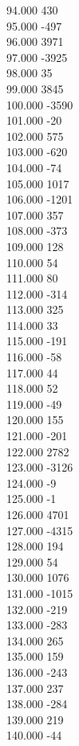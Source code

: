 { 94.000	430 \\
 95.000	-497 \\
 96.000	3971 \\
 97.000	-3925 \\
 98.000	35 \\
 99.000	3845 \\
 100.000	-3590 \\
 101.000	-20 \\
 102.000	575 \\
 103.000	-620 \\
 104.000	-74 \\
 105.000	1017 \\
 106.000	-1201 \\
 107.000	357 \\
 108.000	-373 \\
 109.000	128 \\
 110.000	54 \\
 111.000	80 \\
 112.000	-314 \\
 113.000	325 \\
 114.000	33 \\
 115.000	-191 \\
 116.000	-58 \\
 117.000	44 \\
 118.000	52 \\
 119.000	-49 \\
 120.000	155 \\
 121.000	-201 \\
 122.000	2782 \\
 123.000	-3126 \\
 124.000	-9 \\
 125.000	-1 \\
 126.000	4701 \\
 127.000	-4315 \\
 128.000	194 \\
 129.000	54 \\
 130.000	1076 \\
 131.000	-1015 \\
 132.000	-219 \\
 133.000	-283 \\
 134.000	265 \\
 135.000	159 \\
 136.000	-243 \\
 137.000	237 \\
 138.000	-284 \\
 139.000	219 \\
 140.000	-44 \\
}
